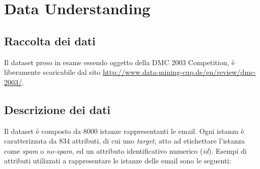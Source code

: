 \chapter{Data Understanding}
\section{Raccolta dei dati}
Il dataset preso in esame essendo oggetto della DMC 2003 Competition, è liberamente scaricabile dal sito \url{http://www.data-mining-cup.de/en/review/dmc-2003/}. 

\section{Descrizione dei dati}
Il dataset è composto da 8000 istanze rappresentanti le email. Ogni istanza è caratterizzata da 834 attributi, di cui uno \textit{target}, atto ad etichettare l'istanza come \textit{spam} o \textit{no-spam}, ed un attributo identificativo numerico (\textit{id}). Esempi di attributi utilizzati a rappresentare le istanze delle email sono le seguenti:

